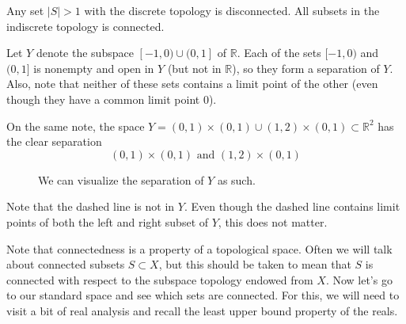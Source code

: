   \begin{example}
    Any set $|S| > 1$ with the discrete topology is disconnected. All subsets in the indiscrete topology is connected.  
  \end{example}

  \begin{example} 
    Let $Y$ denote the subspace $[-1,0) \cup (0,1]$ of $\mathbb{R}$. Each of the sets $[-1,0)$ and $(0,1]$ is nonempty and open in $Y$ (but not in $\mathbb{R}$), so they form a separation of $Y$. Also, note that neither of these sets contains a limit point of the other (even though they have a common limit point $0$). 

    On the same note, the space $Y = (0,1) \times (0,1) \cup (1,2) \times (0,1) \subset \mathbb{R}^2$ has the clear separation 
    \begin{equation}
      (0, 1) \times (0, 1) \text{ and } (1, 2) \times (0, 1)
    \end{equation}

    \begin{figure}[H]
      \centering 
      \caption{We can visualize the separation of $Y$ as such. } 
      \label{fig:separation_of_rectangle}
    \end{figure}
    Note that the dashed line is not in $Y$. Even though the dashed line contains limit points of both the left and right subset of $Y$, this does not matter. 
  \end{example} 

  Note that connectedness is a property of a topological space. Often we will talk about connected subsets $S \subset X$, but this should be taken to mean that $S$ is connected with respect to the subspace topology endowed from $X$. Now let's go to our standard space and see which sets are connected. For this, we will need to visit a bit of real analysis and recall the least upper bound property of the reals. 

